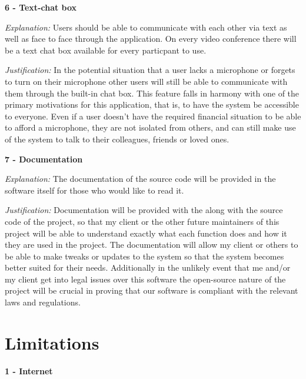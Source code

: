 \textsf{\bfseries 6 - Text-chat box} \\ \vspace{0.1cm}

\textit{Explanation:}
Users should be able to communicate with each other via text
as well as face to face through the application. On every
video conference there will be a text chat box available for
every particpant to use. \vspace{0.1cm}

\textit{Justification:}
In the potential situation that a user
lacks a microphone or forgets to turn on their microphone other 
users will still be able to communicate with them through the 
built-in chat box. This feature falls in harmony with one of 
the primary motivations for this application, that is, to have 
the system be accessible to everyone. Even if a user doesn't
have the required financial situation to be able to afford a 
microphone, they are not isolated from others, and can still 
make use of the system to talk to their colleagues, friends
or loved ones. \vspace{0.2cm}

\textsf{\bfseries 7 - Documentation} \\ \vspace{0.1cm}

\textit{Explanation:}
The documentation of the source code will be provided in the
software itself for those who would like to read it.
\vspace{0.1cm}

\textit{Justification:} 
Documentation will be provided with the along with the source code
of the project, so that my client or the other future maintainers
of this project will be able to understand exactly what each
function does and how it they are used in the project. The 
documentation will allow my client or others to be able to make 
tweaks or updates to the system so that the system becomes better
suited for their needs. Additionally in the unlikely event that me
and/or my client get into legal issues over this software the 
open-source nature of the project will be crucial in proving that
our software is compliant with the relevant laws and regulations.
\vspace{0.2cm}

\section{Limitations}

\textsf{\bfseries 1 - Internet} \\ \vspace{0.1cm} 


